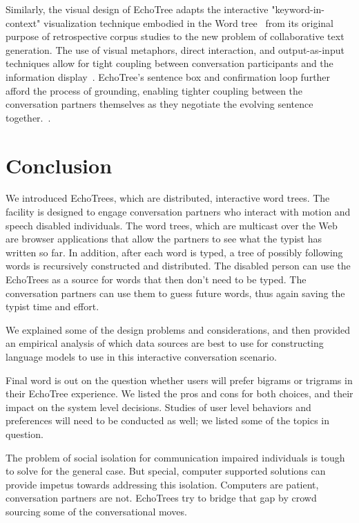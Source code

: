 \documentclass{sigchi}
\begin{document}
Similarly, the visual design of EchoTree adapts the interactive
"keyword-in-context" visualization technique embodied in the Word
tree~\cite{Wattenberg2008} from its original purpose of retrospective
corpus studies to the new problem of collaborative text
generation. The use of visual metaphors, direct interaction, and
output-as-input techniques allow for tight coupling between
conversation participants and the information
display~\cite{Ahlberg1994}. EchoTree's sentence box and confirmation
loop further afford the process of grounding, enabling tighter
coupling between the conversation partners themselves as they
negotiate the evolving sentence together.~\cite{clark1991}.
\linebreak\section{Conclusion}
We introduced EchoTrees, which are distributed, interactive word
trees. The facility is designed to engage conversation partners who
interact with motion and speech disabled individuals. The word trees,
which are multicast over the Web are browser applications that allow
the partners to see what the typist has written so far. In addition,
after each word is typed, a tree of possibly following words is
recursively constructed and distributed.  The disabled person can use
the EchoTrees as a source for words that then don't need to be
typed. The conversation partners can use them to guess future words,
thus again saving the typist time and effort.

We explained some of the design problems and considerations, and then
provided an empirical analysis of which data sources are best to use
for constructing language models to use in this interactive
conversation scenario.

Final word is out on the question whether users will prefer bigrams or
trigrams in their EchoTree experience. We listed the pros and cons for
both choices, and their impact on the system level decisions.  Studies
of user level behaviors and preferences will need to be conducted as
well; we listed some of the topics in question.

The problem of social isolation for communication impaired individuals
is tough to solve for the general case. But special, computer
supported solutions can provide impetus towards addressing this
isolation. Computers are patient, conversation partners are
not. EchoTrees try to bridge that gap by crowd sourcing some of the
conversational moves.
\end{document}
